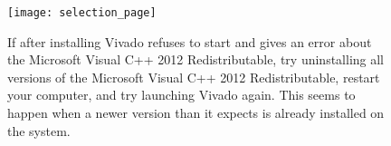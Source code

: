 \begin{figure}[!h]
    \texttt{[image: selection\_page]}
\end{figure}

\begin{figure}[!h]
\begin{mdframed}[style=note]
    If after installing Vivado refuses to start and gives an error about the Microsoft Visual
    C++ 2012 Redistributable, try uninstalling all versions of the Microsoft Visual C++ 2012
    Redistributable, restart your computer, and try launching Vivado again.
    This seems to happen when a newer version than it expects is already installed on the system.
\end{mdframed}
\end{figure}
